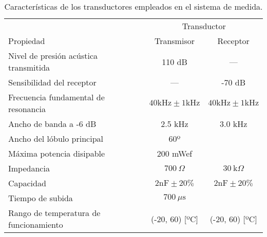 \begin{sidewaystable}
	\centering
	\begin{threeparttable}
	\begin{tabular}{l c c}
		\toprule
		& \multicolumn{2}{c}{Transductor} \\
		\cmidrule(l){2-3}
		Propiedad & Transmisor & Receptor \\
		\midrule
		Nivel de presión acústica transmitida & 110 dB & --- \\
		Sensibilidad del receptor & --- & -70 dB \\
		Frecuencia fundamental de resonancia
		& $40 \text{kHz} \pm 1 \text{kHz}$
		& $40 \text{kHz} \pm 1 \text{kHz}$ \\
		Ancho de banda a -6 dB & 2.5 kHz & 3.0 kHz \\
		Ancho del lóbulo principal & 60º & \\
		Máxima potencia disipable & 200 mWef & \\
		Impedancia & $700\ \Omega$ & $30\ \text{k}\Omega$ \\
		Capacidad & $2 \text{nF} \pm 20\%$
		& $2 \text{nF} \pm 20\%$ \\
		Tiempo de subida & $700\ \mu\text{s}$ & \\
		Rango de temperatura de funcionamiento %
		& (-20, 60) [ºC] & (-20, 60) [ºC] \\
		\bottomrule
	\end{tabular}
	\begin{TableNotes}
	\end{TableNotes}
	\end{threeparttable}
	\caption[Características de los transductores]{Características de
	los transductores empleados en el sistema de medida.}
	\label{tab:transducers}
\end{sidewaystable}

